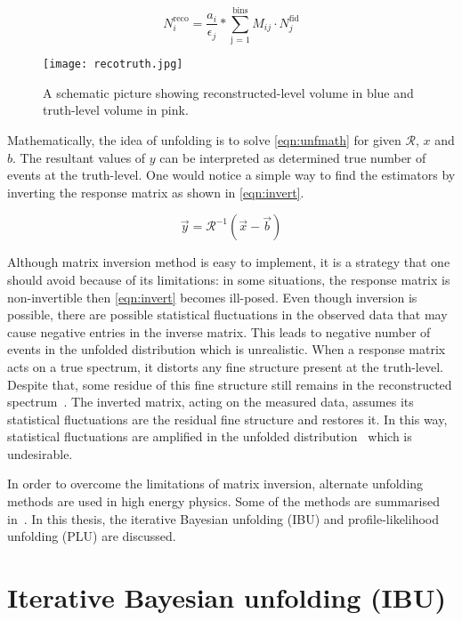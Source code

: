 \begin{equation}
    N_{i}^{\text{reco}} = \frac{a_i}{\epsilon_j} * \sum_{\text{j = 1}}^{\text{bins}} M_{ij} \cdot N_{j}^{\text{fid}} 
\end{equation}


\begin{figure}
    \centering
        \texttt{[image: recotruth.jpg]}
        \caption{A schematic picture showing reconstructed-level volume in blue and 
        truth-level volume in pink.}
           \label{fig:recotruth}
  \end{figure}

Mathematically, the idea of unfolding is to solve \cref{eqn:unfmath} for given 
$\mathcal{R}$, $x$ and $b$. The resultant values of $y$ can be interpreted as 
determined true number of events at the truth-level. One would notice a simple way to 
find the estimators by inverting the response matrix as shown in \cref{eqn:invert}.

\begin{equation}
    \vec{y} = \mathcal{R}^{-1} (\vec{x}-\vec{b})
    \label{eqn:invert}
\end{equation}

Although matrix inversion method is easy to implement, it is a strategy that one should 
avoid because of its limitations: in some situations, the response matrix is non-invertible
then \cref{eqn:invert} becomes ill-posed. Even though inversion is possible, there are possible
statistical fluctuations in the observed data that may cause negative entries in the 
inverse matrix. This leads to negative number of events in the unfolded distribution
which is unrealistic. When a response matrix acts on a true spectrum, it distorts any 
fine structure present at the truth-level. Despite that, some residue of this fine 
structure still remains in the reconstructed spectrum~\cite{cowan}. The inverted matrix, 
acting on the measured data, assumes its statistical fluctuations are the residual fine 
structure and restores it. In this way, statistical fluctuations are amplified in the unfolded
distribution~\cite{inverse} which is undesirable.

In order to overcome the limitations of matrix inversion, alternate unfolding methods are used
in high energy physics. Some of the methods are summarised in~\cite{refId0}.
In this thesis, the iterative Bayesian unfolding (IBU) and profile-likelihood unfolding (PLU)
are discussed.

\section{Iterative Bayesian unfolding (IBU)}

